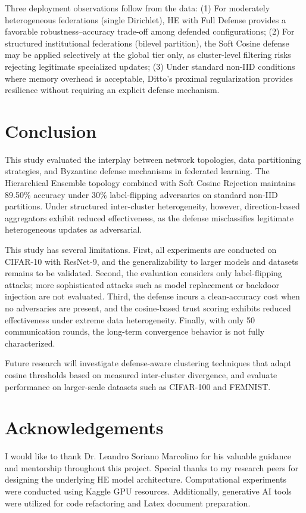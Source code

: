 \documentclass[11pt, a4paper]{article}
\begin{document}
Three deployment observations follow from the data: (1) For moderately heterogeneous federations (single Dirichlet), HE with Full Defense provides a favorable robustness--accuracy trade-off among defended configurations; (2) For structured institutional federations (bilevel partition), the Soft Cosine defense may be applied selectively at the global tier only, as cluster-level filtering risks rejecting legitimate specialized updates; (3) Under standard non-IID conditions where memory overhead is acceptable, Ditto's proximal regularization provides resilience without requiring an explicit defense mechanism.

\FloatBarrier

\section{Conclusion}
This study evaluated the interplay between network topologies, data partitioning strategies, and Byzantine defense mechanisms in federated learning. The Hierarchical Ensemble topology combined with Soft Cosine Rejection maintains 89.50\% accuracy under 30\% label-flipping adversaries on standard non-IID partitions. Under structured inter-cluster heterogeneity, however, direction-based aggregators exhibit reduced effectiveness, as the defense misclassifies legitimate heterogeneous updates as adversarial.

This study has several limitations. First, all experiments are conducted on CIFAR-10 with ResNet-9, and the generalizability to larger models and datasets remains to be validated. Second, the evaluation considers only label-flipping attacks; more sophisticated attacks such as model replacement or backdoor injection are not evaluated. Third, the defense incurs a clean-accuracy cost when no adversaries are present, and the cosine-based trust scoring exhibits reduced effectiveness under extreme data heterogeneity. Finally, with only 50 communication rounds, the long-term convergence behavior is not fully characterized.

Future research will investigate defense-aware clustering techniques that adapt cosine thresholds based on measured inter-cluster divergence, and evaluate performance on larger-scale datasets such as CIFAR-100 and FEMNIST.

\section{Acknowledgements}
I would like to thank Dr. Leandro Soriano Marcolino for his valuable guidance and mentorship throughout this project. Special thanks to my research peers for designing the underlying HE model architecture. Computational experiments were conducted using Kaggle GPU resources. Additionally, generative AI tools were utilized for code refactoring and Latex document preparation.
\end{document}
